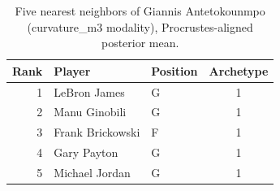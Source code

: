 \begin{table}[htbp]
  \centering\small
  \begin{tabular}{rllc}
    \toprule
    Rank & Player & Position & Archetype \\
    \midrule
    1 & LeBron James & G & 1 \\
    2 & Manu Ginobili & G & 1 \\
    3 & Frank Brickowski & F & 1 \\
    4 & Gary Payton & G & 1 \\
    5 & Michael Jordan & G & 1 \\
    \bottomrule
  \end{tabular}
  \caption{Five nearest neighbors of Giannis Antetokounmpo (curvature_m3 modality), Procrustes-aligned posterior mean.}
  \label{tab:Giannis_Antetokounmpo_neighbors_curvature_m3}
\end{table}

